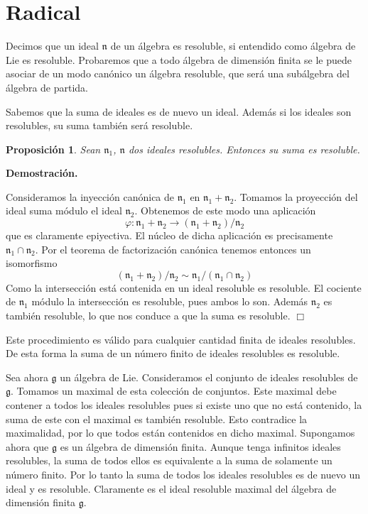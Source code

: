 \documentclass[a4paper,draft,12pt]{article}
\newtheorem{propo}[teo]{Proposición}%
\newcommand{\dem}{\noindent \textbf{Demostración. }\vspace{0.3 cm}}%
\newcommand{\g}{\mathfrak{g}}%
\newcommand{\fin}{ $\Box $ \vspace{0.4 cm}}
\newcommand{\lto}{\longrightarrow}%
\begin{document}
\newpage
\section{Radical}


Decimos que un ideal $\mathfrak{n}$ de un álgebra es resoluble, si entendido como álgebra de Lie es resoluble.  Probaremos que a todo álgebra de dimensión finita se le puede asociar de un modo canónico un álgebra resoluble, que será una subálgebra del álgebra de partida.

Sabemos que la suma de ideales es de nuevo un ideal.  Además si los ideales son resolubles, su suma también será resoluble.

\begin{propo}

Sean $\mathfrak{n}_1$, $ \mathfrak{n}$ dos ideales resolubles.  Entonces su suma es resoluble.

\end{propo}

\dem

Consideramos la inyección canónica de $\mathfrak{n}_1$ en $\mathfrak{n}_1+\mathfrak{n}_2$. Tomamos la proyección del ideal suma módulo el ideal $\mathfrak{n}_2$.  Obtenemos de este modo una aplicación
$$
\varphi: \mathfrak{n}_1+\mathfrak{n}_2\lto (\mathfrak{n}_1+\mathfrak{n}_2)/\mathfrak{n}_2
$$
que es claramente epiyectiva.  El núcleo de dicha aplicación es precisamente $\mathfrak{n}_1 \cap \mathfrak{n}_2$.  Por el teorema de factorización canónica tenemos entonces un isomorfismo
$$
(\mathfrak{n}_1+\mathfrak{n}_2)/\mathfrak{n}_2 \sim \mathfrak{n}_1/(\mathfrak{n}_1 \cap \mathfrak{n}_2)
$$
Como la intersección está contenida en un ideal resoluble es resoluble.  El cociente de $\mathfrak{n}_1$ módulo la intersección es resoluble, pues ambos lo son.  Además $\mathfrak{n}_2$ es también resoluble, lo que nos conduce a que la suma es resoluble.  \fin

Este procedimiento es válido para cualquier cantidad finita de ideales resolubles. De esta forma la suma de un número finito de ideales resolubles es resoluble.

Sea ahora $\g$ un álgebra de Lie.  Consideramos el conjunto de ideales resolubles de $\g$.  Tomamos un maximal de esta colección de conjuntos.  Este maximal debe contener a todos los ideales resolubles pues si existe uno que no está contenido, la suma de este con el maximal es también resoluble.  Esto contradice la maximalidad, por lo que todos están contenidos en dicho maximal. 
Supongamos ahora que $\g$ es un álgebra de dimensión finita.  Aunque tenga infinitos ideales resolubles, la suma de todos ellos es equivalente a la suma de solamente un número finito.  Por lo tanto la suma de todos los ideales resolubles es de nuevo un ideal y es resoluble.  Claramente es el ideal resoluble maximal del álgebra de dimensión finita $\g$.
\end{document}
